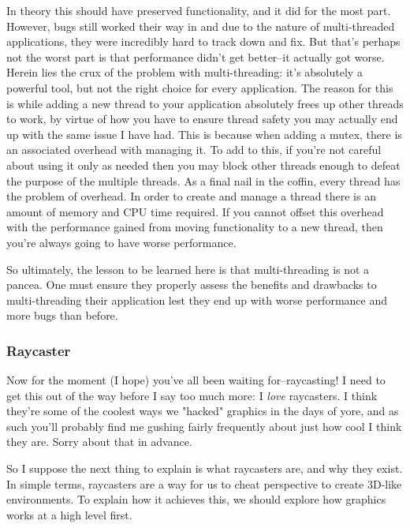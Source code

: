 \documentclass{article}
\begin{document}
In theory this should have preserved functionality, and it did for the most
part. However, bugs still worked their way in and due to the nature of
multi-threaded applications, they were incredibly hard to track down and fix.
But that's perhaps not the worst part is that performance didn't get better--it
actually got worse. Herein lies the crux of the problem with multi-threading:
it's absolutely a powerful tool, but not the right choice for every application.
The reason for this is while adding a new thread to your application absolutely
frees up other threads to work, by virtue of how you have to ensure thread
safety you may actually end up with the same issue I have had. This is because
when adding a mutex, there is an associated overhead with managing it. To add
to this, if you're not careful about using it only as needed then you may block
other threads enough to defeat the purpose of the multiple threads. As a final
nail in the coffin, every thread has the problem of overhead. In order to create
and manage a thread there is an amount of memory and CPU time required. If you
cannot offset this overhead with the performance gained from moving
functionality to a new thread, then you're always going to have worse
performance.

So ultimately, the lesson to be learned here is that multi-threading is not a
pancea. One must ensure they properly assess the benefits and drawbacks to
multi-threading their application lest they end up with worse performance and
more bugs than before.

\subsubsection{Raycaster}
Now for the moment (I hope) you've all been waiting for--raycasting! I need to
get this out of the way before I say too much more: I \textit{love} raycasters.
I think they're some of the coolest ways we "hacked" graphics in the days of
yore, and as such you'll probably find me gushing fairly frequently about just
how cool I think they are. Sorry about that in advance.

So I suppose the next thing to explain is what raycasters are, and why they
exist. In simple terms, raycasters are a way for us to cheat perspective to
create 3D-like environments. To explain how it achieves this, we should explore
how graphics works at a high level first.
\end{document}
